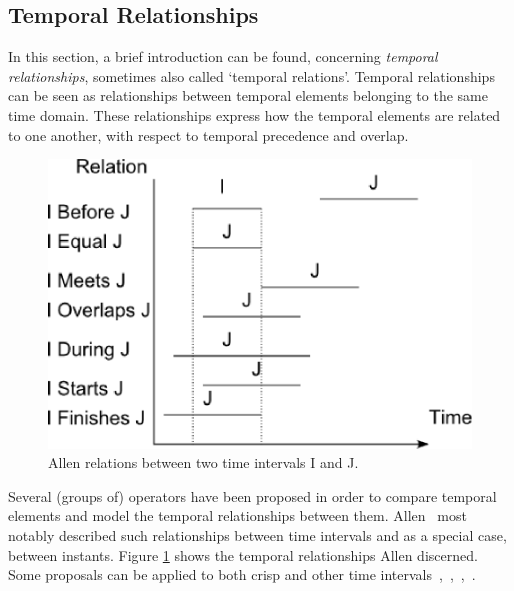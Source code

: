 \subsection{Temporal Relationships}
In this section, a brief introduction can be found, concerning \emph{temporal relationships}, sometimes also called `temporal relations'\cite{Billiet:Pons:Matthe:DeTre:Pons:2011:BipolarFuzzy}. Temporal relationships can be seen as relationships between temporal elements belonging to the same time domain. These relationships express how the temporal elements are related to one another, with respect to temporal precedence and overlap.

\def\JPicScale{0.5}
\begin{figure}[h]
\centering
\includegraphics[scale=0.5]{graphs/allen.eps}
\caption{Allen relations between two time intervals I and J.}
\label{fig:allen}
\end{figure}

Several (groups of) operators have been proposed in order to compare temporal elements and model the temporal relationships between them. Allen~\cite{Allen83} most notably described such relationships between time intervals and as a special case, between instants. Figure \ref{fig:allen} shows the temporal relationships Allen discerned. Some proposals can be applied to both crisp and other time intervals~\cite{ohlbach2004},~\cite{nagypal2003},~\cite{schockaert08},~\cite{garrido2009}.

